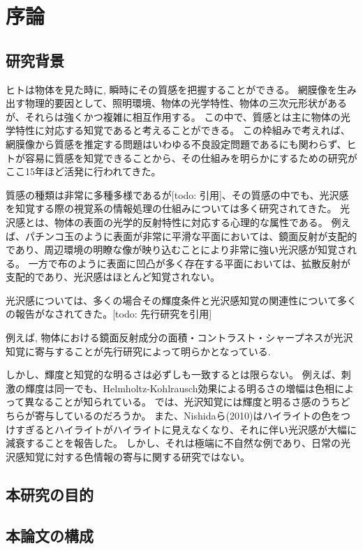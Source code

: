\chapter{序論}
    \section{研究背景}

    ヒトは物体を見た時に, 瞬時にその質感を把握することができる。
    網膜像を生み出す物理的要因として、照明環境、物体の光学特性、物体の三次元形状があるが、それらは強くかつ複雑に相互作用する。
    この中で、質感とは主に物体の光学特性に対応する知覚であると考えることができる。
    この枠組みで考えれば、網膜像から質感を推定する問題はいわゆる不良設定問題であるにも関わらず、ヒトが容易に質感を知覚できることから、その仕組みを明らかにするための研究がここ15年ほど活発に行われてきた。

    質感の種類は非常に多種多様であるが[todo: 引用]、その質感の中でも、光沢感を知覚する際の視覚系の情報処理の仕組みについては多く研究されてきた。
    光沢感とは、物体の表面の光学的反射特性に対応する心理的な属性である。
    例えば、パチンコ玉のように表面が非常に平滑な平面においては、鏡面反射が支配的であり、周辺環境の明瞭な像が映り込むことにより非常に強い光沢感が知覚される。
    一方で布のように表面に凹凸が多く存在する平面においては、拡散反射が支配的であり、光沢感はほとんど知覚されない。

    光沢感については、多くの場合その輝度条件と光沢感知覚の関連性について多くの報告がなされてきた。[todo: 先行研究を引用]

    例えば, 物体における鏡面反射成分の面積・コントラスト・シャープネスが光沢知覚に寄与することが先行研究によって明らかとなっている.


    
    しかし、輝度と知覚的な明るさは必ずしも一致するとは限らない。
    例えば、刺激の輝度は同一でも、Helmholtz-Kohlrausch効果による明るさの増幅は色相によって異なることが知られている。
    では、光沢知覚には輝度と明るさ感のうちどちらが寄与しているのだろうか。
    また、Nishidaら(2010)はハイライトの色をつけすぎるとハイライトがハイライトに見えなくなり、それに伴い光沢感が大幅に減衰することを報告した。
    しかし、それは極端に不自然な例であり、日常の光沢感知覚に対する色情報の寄与に関する研究ではない。


    \section{本研究の目的}
    \section{本論文の構成}